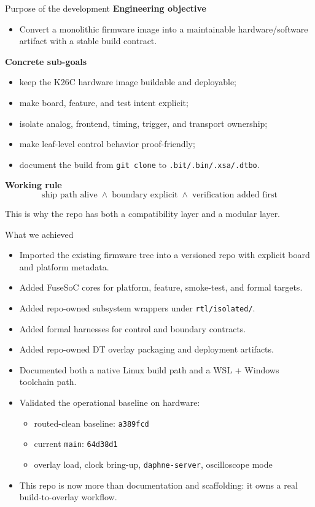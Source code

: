 \documentclass[aspectratio=169]{beamer}
\begin{document}
\begin{frame}{Purpose of the development}
\small
\textbf{Engineering objective}
\begin{itemize}
  \item Convert a monolithic firmware image into a maintainable hardware/software artifact with a stable build contract.
\end{itemize}

\vspace{1mm}
\textbf{Concrete sub-goals}
\begin{itemize}
  \item keep the K26C hardware image buildable and deployable;
  \item make board, feature, and test intent explicit;
  \item isolate analog, frontend, timing, trigger, and transport ownership;
  \item make leaf-level control behavior proof-friendly;
  \item document the build from \texttt{git clone} to \texttt{.bit/.bin/.xsa/.dtbo}.
\end{itemize}

\vspace{1mm}
\textbf{Working rule}
\[
\text{ship path alive} \;\land\; \text{boundary explicit} \;\land\; \text{verification added first}
\]

\vspace{1mm}
This is why the repo has both a compatibility layer and a modular layer.
\end{frame}

\begin{frame}{What we achieved}
\small
\begin{itemize}
  \item Imported the existing firmware tree into a versioned repo with explicit board and platform metadata.
  \item Added FuseSoC cores for platform, feature, smoke-test, and formal targets.
  \item Added repo-owned subsystem wrappers under \texttt{rtl/isolated/}.
  \item Added formal harnesses for control and boundary contracts.
  \item Added repo-owned DT overlay packaging and deployment artifacts.
  \item Documented both a native Linux build path and a WSL + Windows toolchain path.
  \item Validated the operational baseline on hardware:
  \begin{itemize}
    \item routed-clean baseline: \texttt{a389fcd}
    \item current \texttt{main}: \texttt{64d38d1}
    \item overlay load, clock bring-up, \texttt{daphne-server}, oscilloscope mode
  \end{itemize}
  \item This repo is now more than documentation and scaffolding: it owns a real build-to-overlay workflow.
\end{itemize}
\end{frame}
\end{document}
